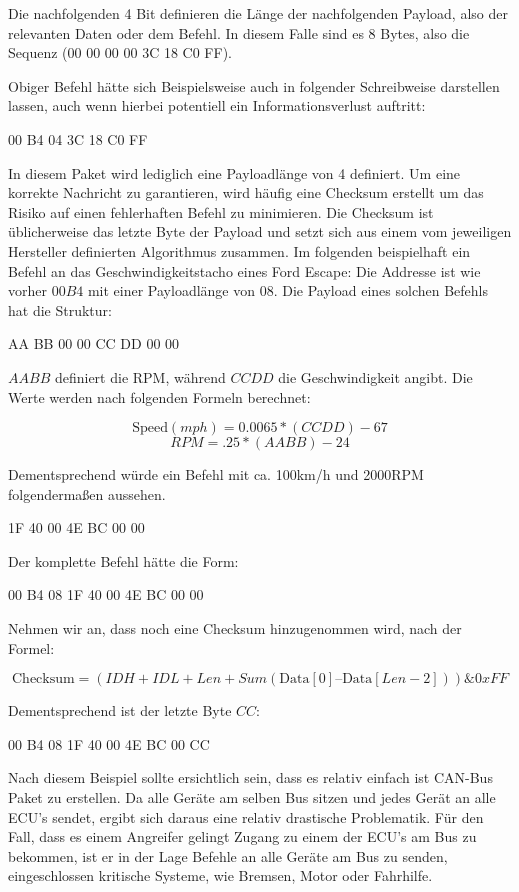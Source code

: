\documentclass[
    fontsize=12pt,
    headings=small,
    parskip=half,           %
    bibliography=totoc,9
    numbers=noenddot,       %
    open=any,               %
    ]{scrreprt}
\begin{document}
Die nachfolgenden 4 Bit definieren die Länge der nachfolgenden Payload, also der relevanten Daten oder dem Befehl. In diesem Falle sind es 8 Bytes, also die Sequenz (00 00 00 00 3C 18 C0 FF).

Obiger Befehl hätte sich Beispielsweise auch in folgender Schreibweise darstellen lassen, auch wenn hierbei potentiell ein Informationsverlust auftritt:

\centerline{00 B4 04 3C 18 C0 FF}

In diesem Paket wird lediglich eine Payloadlänge von 4 definiert. Um eine korrekte Nachricht zu garantieren, wird häufig eine Checksum erstellt um das Risiko auf einen fehlerhaften Befehl zu minimieren. Die Checksum ist üblicherweise das letzte Byte der Payload und setzt sich aus einem vom jeweiligen Hersteller definierten Algorithmus zusammen.
Im folgenden beispielhaft ein Befehl an das Geschwindigkeitstacho eines Ford Escape:
Die Addresse ist wie vorher $00 B4$ mit einer Payloadlänge von $08$. Die Payload eines solchen Befehls hat die Struktur:

\centerline{AA BB 00 00 CC DD 00 00}

$AA BB$ definiert die RPM, während $CC DD$ die Geschwindigkeit angibt. Die Werte werden nach folgenden Formeln berechnet:

\[\text{Speed} (mph) = 0.0065 * (CC DD) - 67\]
\[RPM = .25 * (AA BB) - 24\]

Dementsprechend würde ein Befehl mit ca. 100km/h und 2000RPM folgendermaßen aussehen.

\centerline{1F 40 00 4E BC 00 00}

Der komplette Befehl hätte die Form:

\centerline{00 B4 08 1F 40 00 4E BC 00 00}

Nehmen wir an, dass noch eine Checksum hinzugenommen wird, nach der Formel:

\[\text{Checksum} = (IDH + IDL + Len + Sum(\text{Data}[0] – \text{Data}[Len-2])) \& 0xFF \]

Dementsprechend ist der letzte Byte $CC$:

\centerline{00 B4 08 1F 40 00 4E BC 00 CC}

Nach diesem Beispiel sollte ersichtlich sein, dass es relativ einfach ist CAN-Bus Paket zu erstellen.
Da alle Geräte am selben Bus sitzen und jedes Gerät an alle ECU's sendet, ergibt sich daraus eine relativ drastische Problematik.
Für den Fall, dass es einem Angreifer gelingt Zugang zu einem der ECU's am Bus zu bekommen, ist er in der Lage Befehle an alle Geräte am Bus zu senden, eingeschlossen kritische Systeme, wie Bremsen, Motor oder Fahrhilfe.
\end{document}
